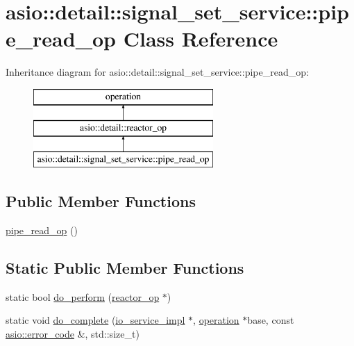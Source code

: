 \hypertarget{classasio_1_1detail_1_1signal__set__service_1_1pipe__read__op}{}\section{asio\+:\+:detail\+:\+:signal\+\_\+set\+\_\+service\+:\+:pipe\+\_\+read\+\_\+op Class Reference}
\label{classasio_1_1detail_1_1signal__set__service_1_1pipe__read__op}
Inheritance diagram for asio\+:\+:detail\+:\+:signal\+\_\+set\+\_\+service\+:\+:pipe\+\_\+read\+\_\+op\+:\begin{figure}[H]
\begin{center}
\leavevmode
\includegraphics[height=3.000000cm]{classasio_1_1detail_1_1signal__set__service_1_1pipe__read__op}
\end{center}
\end{figure}
\subsection*{Public Member Functions}
\begin{DoxyCompactItemize}
\item 
\hyperlink{classasio_1_1detail_1_1signal__set__service_1_1pipe__read__op_ad0bee6b5ebf52d21452c040c9e974533}{pipe\+\_\+read\+\_\+op} ()
\end{DoxyCompactItemize}
\subsection*{Static Public Member Functions}
\begin{DoxyCompactItemize}
\item 
static bool \hyperlink{classasio_1_1detail_1_1signal__set__service_1_1pipe__read__op_a7a7decf136ec00ff15671a3b4fdad329}{do\+\_\+perform} (\hyperlink{classasio_1_1detail_1_1reactor__op}{reactor\+\_\+op} $\ast$)
\item 
static void \hyperlink{classasio_1_1detail_1_1signal__set__service_1_1pipe__read__op_ad4905ddb3001efb6bd77f38360d63aaf}{do\+\_\+complete} (\hyperlink{namespaceasio_1_1detail_a6d61d9b8e53c11288be549d82aec5a42}{io\+\_\+service\+\_\+impl} $\ast$, \hyperlink{namespaceasio_1_1detail_a338968609bec20e37145309f8f9ec936}{operation} $\ast$base, const \hyperlink{classasio_1_1error__code}{asio\+::error\+\_\+code} \&, std\+::size\+\_\+t)
\end{DoxyCompactItemize}
